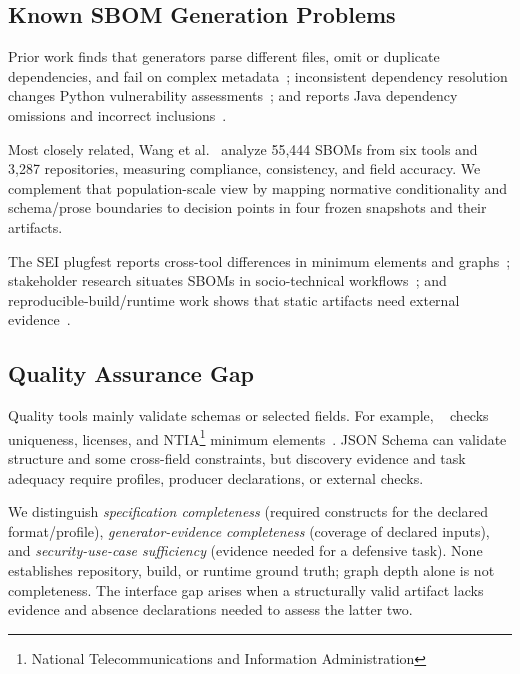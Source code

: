 \subsection{Known SBOM Generation Problems}
Prior work finds that generators parse different files, omit or duplicate dependencies, and fail on complex metadata~\cite{differentialanalysisyu}; inconsistent dependency resolution changes Python vulnerability assessments~\cite{benedettipython2024,odonoghuescored2024}; and  reports Java dependency omissions and incorrect inclusions~\cite{jbomaudit}.

Most closely related, Wang et al.~\cite{wangadherencegap2026} analyze 55,444 SBOMs from six tools and 3,287 repositories, measuring compliance, consistency, and field accuracy. We complement that population-scale view by mapping normative conditionality and schema/prose boundaries to decision points in four frozen snapshots and their artifacts.

The SEI plugfest reports cross-tool differences in minimum elements and graphs~\cite{cmuplugfest}; stakeholder research situates SBOMs in socio-technical workflows~\cite{bomsaway}; and reproducible-build/runtime work shows that static artifacts need external evidence~\cite{reproduciblebuildsforne,nodeshieldcornelissen}.

\subsection{Quality Assurance Gap}
Quality tools mainly validate schemas or selected fields. For example, ~\cite{sbomqs} checks uniqueness, licenses, and NTIA\footnote{National Telecommunications and Information Administration} minimum elements~\cite{ntia2021sbom}. JSON Schema can validate structure and some cross-field constraints, but discovery evidence and task adequacy require profiles, producer declarations, or external checks.

We distinguish \textit{specification completeness} (required constructs for the declared format/profile), \textit{generator-evidence completeness} (coverage of declared inputs), and \textit{security-use-case sufficiency} (evidence needed for a defensive task). None establishes repository, build, or runtime ground truth; graph depth alone is not completeness. The interface gap arises when a structurally valid artifact lacks evidence and absence declarations needed to assess the latter two.
